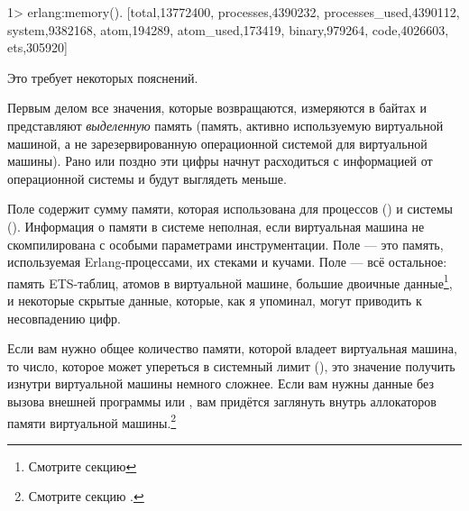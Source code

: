 \begin{VerbatimEshell}
1> erlang:memory().
[{total,13772400},
 {processes,4390232},
 {processes_used,4390112},
 {system,9382168},
 {atom,194289},
 {atom_used,173419},
 {binary,979264},
 {code,4026603},
 {ets,305920}]
\end{VerbatimEshell}

Это требует некоторых пояснений.

Первым делом все значения, которые возвращаются, измеряются в байтах и представляют \emph{выделенную} память (память, активно используемую виртуальной машиной, а не зарезервированную операционной системой для виртуальной машины). Рано или поздно эти цифры начнут расходиться с информацией от операционной системы и будут выглядеть меньше.

Поле  содержит сумму памяти, которая использована для процессов () и системы (). Информация о памяти в системе неполная, если виртуальная машина не скомпилирована с особыми параметрами инструментации. Поле  --- это память, используемая Erlang-процессами, их стеками и кучами. Поле  --- всё остальное: память ETS-таблиц, атомов в виртуальной машине, большие двоичные данные\footnote{Смотрите секцию }, и некоторые скрытые данные, которые, как я упоминал, могут приводить к несовпадению цифр.

Если вам нужно общее количество памяти, которой владеет виртуальная машина, то число, которое может упереться в системный лимит (), это значение получить изнутри виртуальной машины немного сложнее. Если вам нужны данные без вызова внешней программы  или , вам придётся заглянуть внутрь аллокаторов памяти виртуальной машины.\footnote{Смотрите секцию .}

